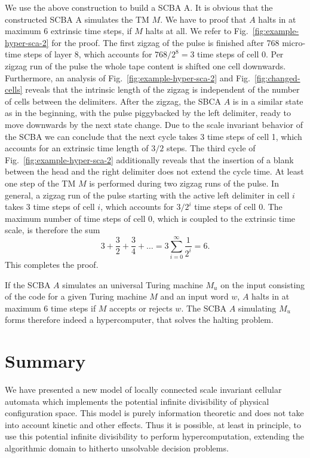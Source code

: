 \documentclass[pre,amssymb,showpacs,showkeys,preprint]{revtex4}
\begin{document}
We use the above construction to build a SCBA A.
It is obvious that the constructed SCBA A simulates the TM $M$.
We have to proof that $A$ halts in at maximum 6 extrinsic time steps, if $M$ halts at all.
We refer to Fig.~\ref{fig:example-hyper-sca-2} for the proof.
The first zigzag of the pulse is finished after 768 micro-time steps of layer 8, which accounts for
$768/2^8=3$ time steps of cell 0.
Per zigzag run of the pulse the whole tape content
is shifted one cell downwards.
Furthermore, an analysis of Fig.~\ref{fig:example-hyper-sca-2} and Fig.~\ref{fig:changed-cells}
reveals  that the intrinsic length of the zigzag is independent of the number of cells between the
delimiters.
After the zigzag, the SBCA $A$ is in a similar state as in the beginning, with the pulse
piggybacked by the left delimiter, ready to move downwards by the next state change.
Due to the scale invariant behavior of the SCBA we can conclude that the next cycle takes
3 time steps of cell 1, which accounts for an extrinsic time length of $3/2$ steps.
The third cycle of Fig.~\ref{fig:example-hyper-sca-2} additionally reveals that the insertion of a
blank between the head and the right delimiter does not extend the cycle time.
At least one step of the TM $M$ is performed during two zigzag runs of the pulse.
In general, a zigzag run of the pulse starting with the active left delimiter in cell $i$ takes
3 time steps of cell $i$, which accounts for $3/2^i$ time steps of cell 0.
The maximum number of time steps of cell 0, which is coupled to the extrinsic time scale, is
therefore the sum
\[
3 + \frac{3}{2} + \frac{3}{4} + \ldots = 3 \sum_{i=0}^{\infty} \frac{1}{2^i} = 6.
\]
This completes the proof.

If the SCBA $A$ simulates an universal Turing machine $M_u$ on the input consisting of the code
for a given Turing machine $M$ and an input word $w$, $A$ halts in at maximum 6 time steps if
$M$ accepts or rejects $w$.
The SCBA $A$ simulating $M_u$ forms therefore indeed a hypercomputer, that solves the halting
problem.

\section{Summary}

We have presented a new model of locally
connected scale invariant cellular automata which
implements the potential infinite divisibility of physical configuration space.
This model is purely information theoretic and
does not take into account kinetic and other
effects. Thus it is possible, at least in
principle, to use this potential infinite
divisibility to perform hypercomputation,
extending the algorithmic domain to hitherto unsolvable decision problems.
\end{document}
